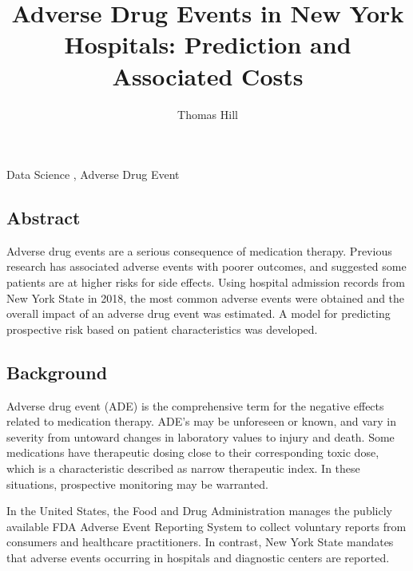 \documentclass[preprint, 3p,
authoryear]{elsarticle} %
\begin{document}
\begin{frontmatter}

  \title{Adverse Drug Events in New York Hospitals: Prediction and
Associated Costs}
    \author[CUNY School of Profesional Services]{Thomas Hill%
  }
  
  \begin{abstract}
  
  \end{abstract}
    \begin{keyword}
    Data Science \sep 
    Adverse Drug Event
  \end{keyword}
  
 \end{frontmatter}

\hypertarget{abstract}{%
\subsection{Abstract}\label{abstract}}

Adverse drug events are a serious consequence of medication therapy.
Previous research has associated adverse events with poorer outcomes,
and suggested some patients are at higher risks for side effects. Using
hospital admission records from New York State in 2018, the most common
adverse events were obtained and the overall impact of an adverse drug
event was estimated. A model for predicting prospective risk based on
patient characteristics was developed.

\hypertarget{background}{%
\subsection{Background}\label{background}}

Adverse drug event (ADE) is the comprehensive term for the negative
effects related to medication therapy. ADE's may be unforeseen or known,
and vary in severity from untoward changes in laboratory values to
injury and death. Some medications have therapeutic dosing close to
their corresponding toxic dose, which is a characteristic described as
narrow therapeutic index. In these situations, prospective monitoring
may be warranted.

In the United States, the Food and Drug Administration manages the
publicly available FDA Adverse Event Reporting System to collect
voluntary reports from consumers and healthcare practitioners. In
contrast, New York State mandates that adverse events occurring in
hospitals and diagnostic centers are reported.
\end{document}
